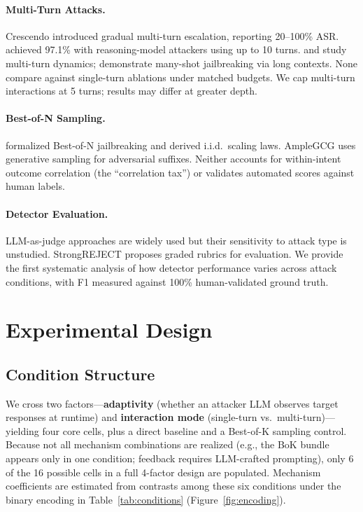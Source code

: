 \documentclass[11pt]{article}
\begin{document}
\paragraph{Multi-Turn Attacks.}
Crescendo \cite{russinovich2024crescendo} introduced gradual multi-turn escalation, reporting 20--100\% ASR. \citet{hagendorff2026reasoning} achieved 97.1\% with reasoning-model attackers using up to 10 turns. \citet{li2024multiturn} and \citet{yang2024chain} study multi-turn dynamics; \citet{anil2024manyshot} demonstrate many-shot jailbreaking via long contexts. None compare against single-turn ablations under matched budgets. We cap multi-turn interactions at 5 turns; results may differ at greater depth.

\paragraph{Best-of-N Sampling.}
\citet{hughes2024bestofn} formalized Best-of-N jailbreaking and derived i.i.d.\ scaling laws. AmpleGCG \cite{liao2024amplecgc} uses generative sampling for adversarial suffixes. Neither accounts for within-intent outcome correlation (the ``correlation tax'') or validates automated scores against human labels.

\paragraph{Detector Evaluation.}
LLM-as-judge approaches are widely used \cite{mazeika2024harmbench,chao2024jailbreakbench} but their sensitivity to attack type is unstudied. StrongREJECT \cite{souly2024strongreject} proposes graded rubrics for evaluation. We provide the first systematic analysis of how detector performance varies across attack conditions, with F1 measured against 100\% human-validated ground truth.

\section{Experimental Design}
\label{sec:design}

\subsection{Condition Structure}
\label{sec:factorial}

We cross two factors---\textbf{adaptivity} (whether an attacker LLM observes target responses at runtime) and \textbf{interaction mode} (single-turn vs.\ multi-turn)---yielding four core cells, plus a direct baseline and a Best-of-K sampling control. Because not all mechanism combinations are realized (e.g., the BoK bundle appears only in one condition; feedback requires LLM-crafted prompting), only 6 of the 16 possible cells in a full 4-factor design are populated. Mechanism coefficients are estimated from contrasts among these six conditions under the binary encoding in Table~\ref{tab:conditions} (Figure~\ref{fig:encoding}).
\end{document}
